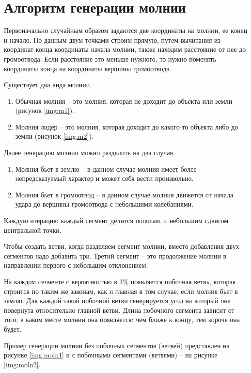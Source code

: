 \section{Алгоритм генерации молнии}
Первоначально случайным образом задаются две координаты на молнии, ее конец и начало. По данным двум точками строим прямую, путем вычитания из координат конца координаты начала молнии, также находим расстояние от нее до громоотвода. Если расстояние это меньше нужного, то нужно поменять координаты конца на координаты вершины громоотвода.

Существует два вида молнии.
\begin{enumerate}
	\item Обычная молния – это молния, которая не доходит до объекта или земли (рисунок \ref{img:m1}).
	\item Молния лидер – это молния, которая доходит до какого-то объекта либо до земли (рисунок \ref{img:m2}). 
\end{enumerate}



Далее генерацию молнии можно разделить на два случая.
\begin{enumerate}
	\item Молния бьет в землю – в данном случае молния имеет более непредсказуемый характер и может себя вести произвольно.
	\item Молния бьет в громоотвод – в данном случае молния движется от начала удара до вершины громоотвода с небольшими колебаниями.
\end{enumerate}

Каждую итерацию каждый сегмент делится пополам, с небольшим сдвигом центральной точки.

Чтобы создать ветви, когда разделяем сегмент молнии, вместо добавления двух сегментов надо добавить три. Третий сегмент – это продолжение молнии в направлении первого с небольшим отклонением.

На каждом сегменте с вероятностью в 1\% появляется побочная ветвь, которая строится по таким же законам, как и главная в том случае, если молния бьет в землю. Для каждой такой побочной ветви генерируется угол на который она повернута относительно главной ветви. Длина побочного сегмента зависит от того, в каком месте молнии она появляется: чем ближе к концу, тем короче она будет. 

Пример генерации молнии без побочных сегментов (ветвей) представлен на рисунке \ref{img:moln1} и с побочными сегментами (ветвями) -- на рисунке \ref{img:moln2}.

